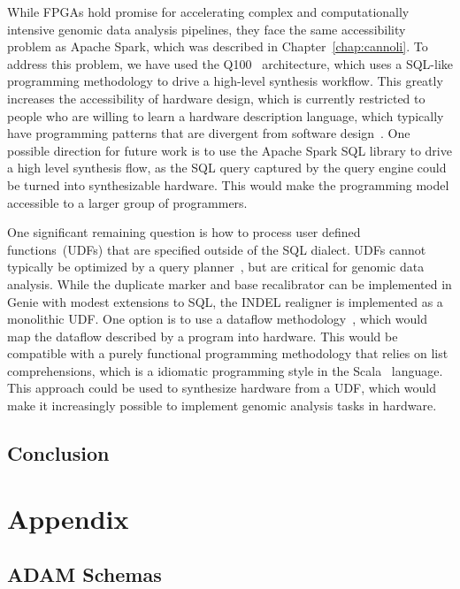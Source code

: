 \documentclass[phd]{ucbthesis}
\begin{document}
While FPGAs hold promise for accelerating complex and computationally intensive
genomic data analysis pipelines, they face the same accessibility problem
as {Apache Spark}, which was described in Chapter~\ref{chap:cannoli}. To
address this problem, we have used the Q100~\cite{wu14} architecture, which uses
a SQL-like programming methodology to drive a high-level synthesis workflow.
This greatly increases the accessibility of hardware design, which is currently
restricted to people who are willing to learn a hardware description language,
which typically have programming patterns that are divergent from software
design~\cite{bachrach12}. One possible direction for future work is to use the
{Apache Spark SQL} library to drive a high level synthesis flow, as the
SQL query captured by the query engine could be turned into synthesizable
hardware. This would make the programming model accessible to a larger group of
programmers.

One significant remaining question is how to process user defined
functions~(UDFs) that are specified outside of the SQL dialect. UDFs cannot
typically be optimized by a query planner~\cite{armbrust15, kornacker15}, but
are critical for genomic data analysis. While the duplicate marker and base
recalibrator can be implemented in {Genie} with modest extensions to SQL,
the INDEL realigner is implemented as a monolithic UDF. One option is to use a
dataflow methodology~\cite{bhattacharyya08}, which would map the dataflow
described by a program into hardware. This would be compatible with a purely
functional programming methodology that relies on list comprehensions, which is
a idiomatic programming style in the {Scala}~\cite{odersky04} language.
This approach could be used to synthesize hardware from a UDF, which would make
it increasingly possible to implement genomic analysis tasks in hardware.

\chapter{Conclusion}
\label{chap:conclusion}

\appendix

\part{Appendix}

\chapter{ADAM Schemas}
\label{chap:schemas}
\end{document}
